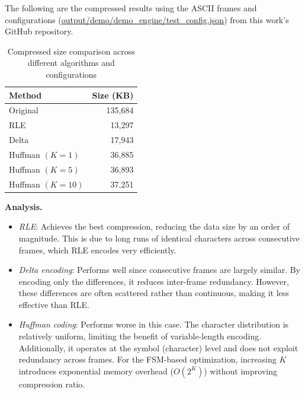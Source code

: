 The following are the compressed results using the ASCII frames and configurations (\url{output/demo/demo_engine/test_config.json}) from this work's GitHub repository.

\begin{table}[H]
\centering
\begin{tabular}{l|r}
\textbf{Method} & \textbf{Size (KB)} \\
\hline
Original & 135,684 \\
RLE & 13,297 \\
Delta & 17,943 \\
Huffman $(K=1)$ & 36,885 \\
Huffman $(K=5)$ & 36,893 \\
Huffman $(K=10)$ & 37,251 \\
\end{tabular}
\caption{Compressed size comparison across different algorithms and configurations}
\label{tab:compression-size}
\end{table}

\noindent \textbf{Analysis.}

\begin{itemize}
    \item \textit{RLE}: Achieves the best compression, reducing the data size by an order of magnitude. This is due to long runs of identical characters across consecutive frames, which RLE encodes very efficiently.

    \item \textit{Delta encoding}: Performs well since consecutive frames are largely similar. By encoding only the differences, it reduces inter-frame redundancy. However, these differences are often scattered rather than continuous, making it less effective than RLE.

    \item \textit{Huffman coding}: Performs worse in this case. The character distribution is relatively uniform, limiting the benefit of variable-length encoding. Additionally, it operates at the symbol (character) level and does not exploit redundancy across frames. For the FSM-based optimization, increasing $K$ introduces exponential memory overhead ($O(2^K)$) without improving compression ratio.
\end{itemize}
